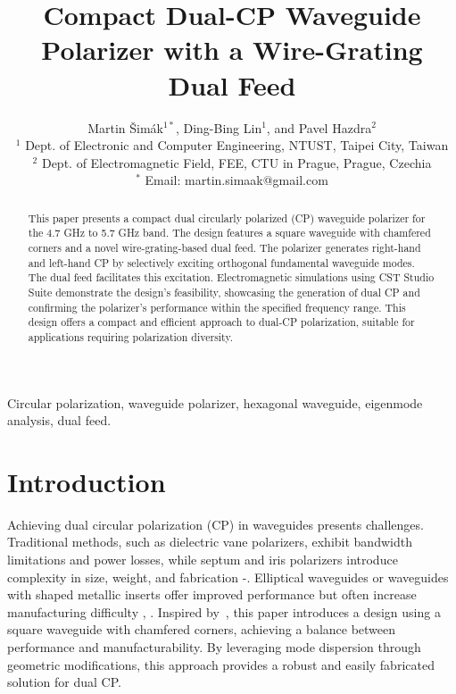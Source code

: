 \documentclass[conference,a4paper]{isap2025}
\title{Compact Dual-CP Waveguide Polarizer with a Wire-Grating Dual Feed}
\author{
Martin Šimák$^{1*}$, Ding-Bing Lin$^1$, and Pavel Hazdra$^2$
\\
$^1$ Dept. of Electronic and Computer Engineering, NTUST, Taipei City, Taiwan
\\
$^2$ Dept. of Electromagnetic Field, FEE, CTU in Prague, Prague, Czechia
\\
$^*$ Email: martin.simaak@gmail.com
}
\begin{document}
\baselineskip 4.5mm

\maketitle

\begin{abstract}
This paper presents a compact dual circularly polarized (CP) waveguide polarizer for the 4.7 GHz to 5.7 GHz band.  The design features a square waveguide with chamfered corners and a novel wire-grating-based dual feed.  The polarizer generates right-hand and left-hand CP by selectively exciting orthogonal fundamental waveguide modes. The dual feed facilitates this excitation.  Electromagnetic simulations using CST Studio Suite demonstrate the design's feasibility, showcasing the generation of dual CP and confirming the polarizer's performance within the specified frequency range. This design offers a compact and efficient approach to dual-CP polarization, suitable for applications requiring polarization diversity.
\end{abstract}

\begin{IEEEkeywords}
Circular polarization, waveguide polarizer, hexagonal waveguide, eigenmode analysis, dual feed.
\end{IEEEkeywords}


\section{Introduction}
Achieving dual circular polarization (CP) in waveguides presents challenges. Traditional methods, such as dielectric vane polarizers, exhibit bandwidth limitations and power losses, while septum and iris polarizers introduce complexity in size, weight, and fabrication \cite{ruiz-cruz-et-al:compact-reconfigurable-waveguide-circular-polarizer}-\cite{virone-et-al:optimum-iris-set-concept-for-waveguide-polarizers}. Elliptical waveguides or waveguides with shaped metallic inserts offer improved performance but often increase manufacturing difficulty \cite{yu-et-al:a-wideband-circularly-polarized-horn-antenna-with-a-tapered-elliptical-waveguide-polarizer}, \cite{rud-shpachenko:polarizers-on-sections-of-square-waveguides-with-inner-corner-ridges}.  Inspired by~\cite{bhardwaj-volakis:hexagonal-waveguides-new-class-of-waveguides-for-mmwave-circularly-polarized-horns}, this paper introduces a design using a square waveguide with chamfered corners, achieving a balance between performance and manufacturability.  By leveraging mode dispersion through geometric modifications, this approach provides a robust and easily fabricated solution for dual CP.
\end{document}
